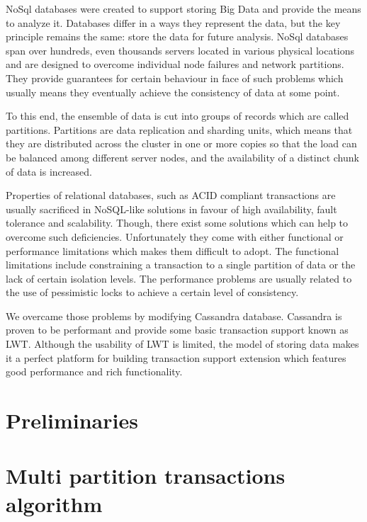 \documentclass[runningheads,a4paper]{llncs}
\begin{document}
NoSql databases were created to support storing Big Data and provide the means
to analyze it.  Databases differ in a ways they represent the data, but the key
principle remains the same:  store the data for future analysis. NoSql databases
span over hundreds, even thousands servers  located in various physical
locations and are designed to overcome individual node  failures and network
partitions. They provide guarantees for certain behaviour in face of such
problems which usually means they eventually achieve the consistency of data at
some point.

To this end, the ensemble of data is cut into groups of records which are called
partitions.  Partitions are data replication and sharding units, which means
that they are distributed across  the cluster in one or more copies so that the
load can be balanced among different server nodes, and the availability of a
distinct chunk of data is increased.

Properties of relational databases, such as ACID compliant transactions are
usually sacrificed in NoSQL-like solutions in favour of high availability, fault
tolerance and scalability. Though,  there exist some solutions which can help to
overcome such deficiencies. Unfortunately they come with either functional or
performance limitations which makes them difficult to adopt.  The functional
limitations include constraining a transaction to a single partition of data or
the lack of certain isolation levels. The performance problems are usually
related to the  use of pessimistic locks to achieve a certain level of
consistency.

We overcame those problems by modifying Cassandra database. Cassandra is proven
to be performant  and provide some basic transaction support known as LWT.
Although the usability of LWT is limited, the model of storing data makes it a
perfect platform for building transaction support extension which features good
performance and rich functionality.


\section{Preliminaries}





\section{Multi partition transactions algorithm}
\end{document}
